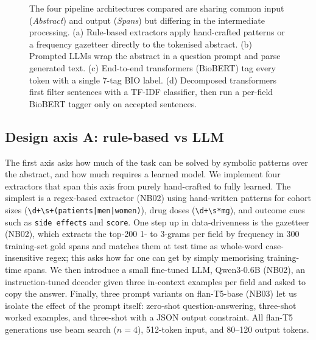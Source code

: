 \documentclass[11pt]{article}
\begin{document}
\begin{figure}[tbp]
\caption{The four pipeline architectures compared are sharing
common input (\textit{Abstract}) and output (\textit{Spans}) but differing
in the intermediate processing.
(a) Rule-based extractors apply hand-crafted patterns or a frequency
gazetteer directly to the tokenised abstract.
(b) Prompted LLMs wrap the abstract in a question prompt and parse
generated text.
(c) End-to-end transformers (BioBERT) tag every token with a single
7-tag BIO label.
(d) Decomposed transformers first filter sentences with a TF-IDF
classifier, then run a per-field BioBERT tagger only on accepted
sentences.}
\label{fig:pipelines}
\end{figure}

\subsection{Design axis A: rule-based vs LLM}

The first axis asks how much of the task can be solved by symbolic
patterns over the abstract, and how much requires a learned model. We
implement four extractors that span this axis from purely hand-crafted
to fully learned. The simplest is a regex-based extractor (NB02) using
hand-written patterns for cohort sizes
(\verb!\d+\s+(patients|men|women)!), drug doses (\verb!\d+\s*mg!), and
outcome cues such as \verb!side effects! and \verb!score!. One step up
in data-drivenness is the gazetteer (NB02), which extracts the
top-200 1- to 3-grams per field by frequency in 300 training-set gold
spans and matches them at test time as whole-word case-insensitive
regex; this asks how far one can get by simply memorising training-time
spans. We then introduce a small fine-tuned LLM, Qwen3-0.6B (NB02), an
instruction-tuned decoder \citep{qwen2024} given three in-context
examples per field and asked to copy the answer. Finally, three prompt
variants on flan-T5-base \citep[250M parameters,][]{chung2022flan} (NB03)
let us isolate the effect of the prompt itself: zero-shot
question-answering, three-shot worked examples, and three-shot with a
JSON output constraint. All flan-T5 generations use beam search
($n\!=\!4$), 512-token input, and 80--120 output tokens.
\end{document}
